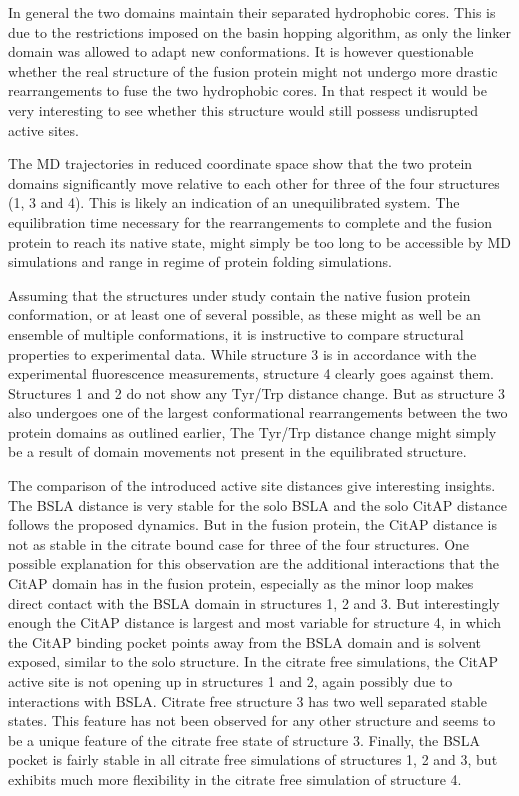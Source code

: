 \documentclass[english, a4paper, 12pt, titlepage, draft]{article}
\begin{document}
In general the two domains maintain their separated hydrophobic cores.
This is due to the restrictions imposed on the basin hopping algorithm, as only the linker domain was allowed to adapt new conformations.
It is however questionable whether the real structure of the fusion protein might not undergo more drastic rearrangements to fuse the two hydrophobic cores.
In that respect it would be very interesting to see whether this structure would still possess undisrupted active sites.

The MD trajectories in reduced coordinate space show that the two protein domains significantly move relative to each other for three of the four structures (1, 3 and 4).
This is likely an indication of an unequilibrated system.
The equilibration time necessary for the rearrangements to complete and the fusion protein to reach its native state, might simply be too long to be accessible by MD simulations and range in regime of protein folding simulations.


Assuming that the structures under study contain the native fusion protein conformation, or at least one of several possible, as these might as well be an ensemble of multiple conformations, it is instructive to compare structural properties to experimental data.
While structure 3 is in accordance with the experimental fluorescence measurements, structure 4 clearly goes against them.
Structures 1 and 2 do not show any Tyr/Trp distance change.
But as structure 3 also undergoes one of the largest conformational rearrangements between the two protein domains as outlined earlier,
The Tyr/Trp distance change might simply be a result of domain movements not present in the equilibrated structure.

The comparison of the introduced active site distances give interesting insights.
The BSLA distance is very stable for the solo BSLA and the solo CitAP distance follows the proposed dynamics.
But in the fusion protein, the CitAP distance is not as stable in the citrate bound case for three of the four structures.
One possible explanation for this observation are the additional interactions that the CitAP domain has in the fusion protein, especially as the minor loop makes direct contact with the BSLA domain in structures 1, 2 and 3.
But interestingly enough the CitAP distance is largest and most variable for structure 4, in which the CitAP binding pocket points away from the BSLA domain and is solvent exposed, similar to the solo structure.
In the citrate free simulations, the CitAP active site is not opening up in structures 1 and 2, again possibly due to interactions with BSLA.
Citrate free structure 3 has two well separated stable states.
This feature has not been observed for any other structure and seems to be a unique feature of the citrate free state of structure 3.
Finally, the BSLA pocket is fairly stable in all citrate free simulations of structures 1, 2 and 3, but exhibits much more flexibility in the citrate free simulation of structure 4.
\end{document}
